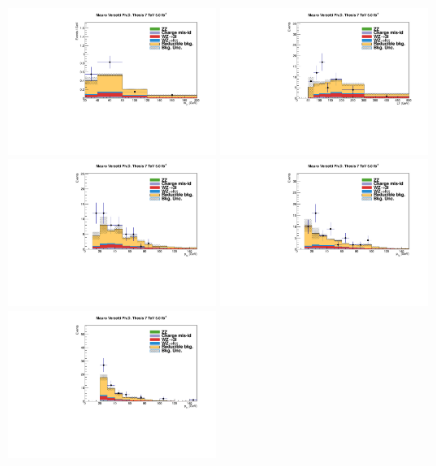 \begin{figure}
\begin{center}
  \includegraphics[width=0.49\textwidth]{4_Analisys/pics/7TeV/plots/emt/f3/Full_charge3/final-f3-subMass-Full.pdf}
  \includegraphics[width=0.49\textwidth]{4_Analisys/pics/7TeV/plots/emt/f3/final-f3-LT-charge3.pdf}\\
  \includegraphics[width=0.49\textwidth]{4_Analisys/pics/7TeV/plots/emt/f3/Full_charge3/final-f3-ePt-Full.pdf}
  \includegraphics[width=0.49\textwidth]{4_Analisys/pics/7TeV/plots/emt/f3/Full_charge3/final-f3-mPt-Full.pdf}\\
  \includegraphics[width=0.49\textwidth]{4_Analisys/pics/7TeV/plots/emt/f3/Full_charge3/final-f3-tPt-Full.pdf}

\end{center}
\end{figure}
